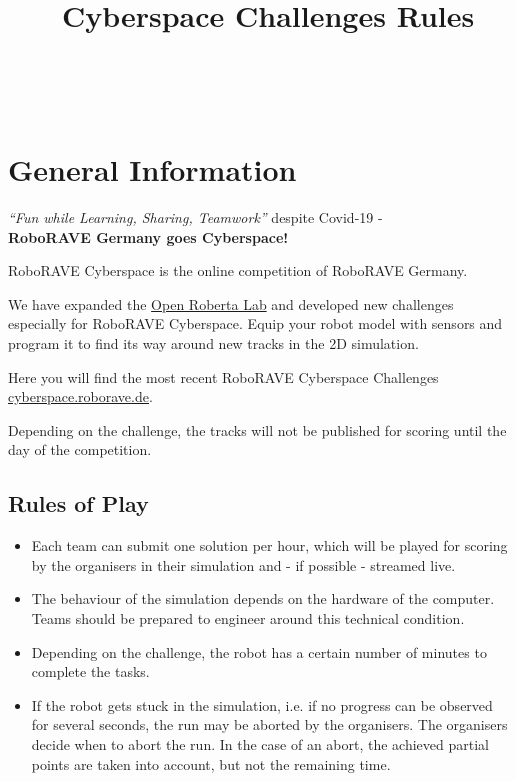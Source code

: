\documentclass[a4paper,12pt]{article}
\begin{document}


\title{\tagYear\ Cyberspace Challenges Rules}
\makeatletter
\let\inserttitle\@title
\makeatother
\begin{center}
	\rrcybLogo
	\huge                      %
	\bfseries                   %
	\\
	\inserttitle
\end{center}

\section{General Information}

\begin{center}
\emph{"`Fun while Learning, Sharing, Teamwork"'} despite Covid-19 -
\\
\textbf{RoboRAVE Germany goes Cyberspace!}
\end{center}

RoboRAVE Cyberspace is the online competition of RoboRAVE Germany.

We have expanded the
\href{https://www.roberta-home.de/lab/}{Open Roberta Lab}
and developed new challenges especially for RoboRAVE Cyberspace.
Equip your robot model with sensors and program it to find its way around new
tracks in the 2D simulation.

Here you will find the most recent RoboRAVE Cyberspace Challenges
\href{https://cyberspace.roborave.de}{cyberspace.roborave.de}.

Depending on the challenge, the tracks will not be published for scoring until
the day of the competition.

\subsection{Rules of Play}

\begin{itemize}
	\item Each team can submit one solution per hour, which will be played
		for scoring by the organisers in their simulation and - if
		possible - streamed live.
	\item The behaviour of the simulation depends on the hardware of the
		computer.  Teams should be prepared to engineer around this
		technical condition.
	\item Depending on the challenge, the robot has a certain number of
		minutes to complete the tasks.
	\item If the robot gets stuck in the simulation, i.e. if no progress
		can be observed for several seconds, the run may be aborted
		by the organisers. The organisers decide when to abort the run.
		In the case of an abort, the achieved partial points are taken
		into account, but not the remaining time.
\end{itemize}
\end{document}
